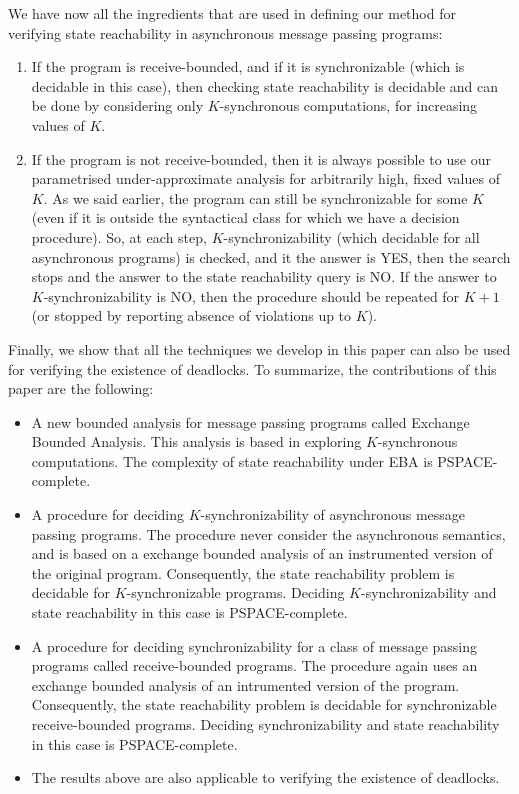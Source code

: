We have now all the ingredients that are used in defining our method for verifying state reachability in asynchronous message passing programs: 
\begin{enumerate}
\item
If the program is receive-bounded, and if it is synchronizable (which is decidable in this case), then checking state reachability is decidable and can be done by considering only $K$-synchronous computations, for increasing values of $K$. 
\item 
If the program is not receive-bounded, then it is always possible to use our parametrised under-approximate analysis for arbitrarily high, fixed values of $K$. As we said earlier, the program can still be synchronizable for some $K$ (even if it is outside the syntactical class for which we have a decision procedure). So, at each step, $K$-synchronizability (which decidable for all asynchronous programs) is checked, and it the answer is YES, then the search stops and the answer to the state reachability query is NO. If the answer to $K$-synchronizability is NO, then the procedure should be repeated for $K+1$ (or stopped by reporting absence of violations up to $K$).  
\end{enumerate}

Finally, we show that all the techniques we develop in this paper can also be used for verifying the existence of deadlocks. To summarize, the contributions of this paper are the following:

\begin{itemize}
\item A new bounded analysis for message passing programs called Exchange Bounded Analysis. This analysis is based in exploring $K$-synchronous computations. The complexity of state reachability under EBA is PSPACE-complete. 

\item A procedure for deciding $K$-synchronizability of asynchronous message passing programs. The procedure never consider the asynchronous semantics, and is based on a exchange bounded analysis of an instrumented version of the original program. Consequently, the state reachability problem is decidable for $K$-synchronizable programs. Deciding  $K$-synchronizability and state reachability in this case is PSPACE-complete. 

\item A procedure for deciding synchronizability for a class of message passing programs called receive-bounded programs. The procedure again uses an exchange bounded analysis of an intrumented version of the program. Consequently, the state reachability problem is decidable for synchronizable receive-bounded programs.  Deciding  synchronizability and state reachability in this case is PSPACE-complete. 

\item The results above are also applicable to verifying the existence of deadlocks. 

\end{itemize}
